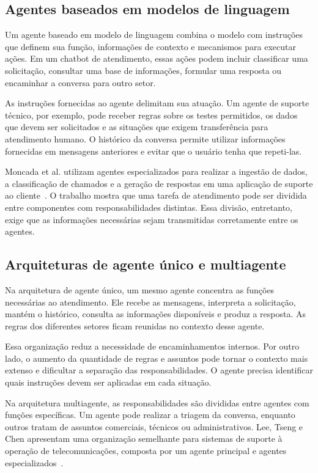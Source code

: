 \subsection{Agentes baseados em modelos de linguagem}
\label{subsec:agentes-llm}

Um agente baseado em modelo de linguagem combina o modelo com instruções que definem sua função, informações de contexto e mecanismos para executar ações. Em um chatbot de atendimento, essas ações podem incluir classificar uma solicitação, consultar uma base de informações, formular uma resposta ou encaminhar a conversa para outro setor.

As instruções fornecidas ao agente delimitam sua atuação. Um agente de suporte técnico, por exemplo, pode receber regras sobre os testes permitidos, os dados que devem ser solicitados e as situações que exigem transferência para atendimento humano. O histórico da conversa permite utilizar informações fornecidas em mensagens anteriores e evitar que o usuário tenha que repeti-las.

Moncada et al. utilizam agentes especializados para realizar a ingestão de dados, a classificação de chamados e a geração de respostas em uma aplicação de suporte ao cliente~\cite{moncada2025}. O trabalho mostra que uma tarefa de atendimento pode ser dividida entre componentes com responsabilidades distintas. Essa divisão, entretanto, exige que as informações necessárias sejam transmitidas corretamente entre os agentes.

\subsection{Arquiteturas de agente único e multiagente}
\label{subsec:arquiteturas}

Na arquitetura de agente único, um mesmo agente concentra as funções necessárias ao atendimento. Ele recebe as mensagens, interpreta a solicitação, mantém o histórico, consulta as informações disponíveis e produz a resposta. As regras dos diferentes setores ficam reunidas no contexto desse agente.

Essa organização reduz a necessidade de encaminhamentos internos. Por outro lado, o aumento da quantidade de regras e assuntos pode tornar o contexto mais extenso e dificultar a separação das responsabilidades. O agente precisa identificar quais instruções devem ser aplicadas em cada situação.

Na arquitetura multiagente, as responsabilidades são divididas entre agentes com funções específicas. Um agente pode realizar a triagem da conversa, enquanto outros tratam de assuntos comerciais, técnicos ou administrativos. Lee, Tseng e Chen apresentam uma organização semelhante para sistemas de suporte à operação de telecomunicações, composta por um agente principal e agentes especializados~\cite{lee2025}.


